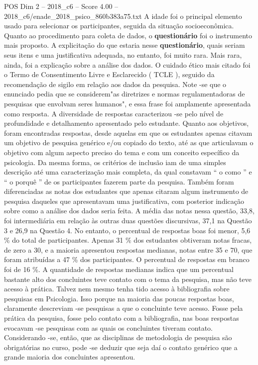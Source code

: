 \begin{textsample}{POS Dim 2 – 2018\_c6 – Score 4.00 – 2018\_c6/enade\_2018\_psico\_860b383a75.txt}
A idade foi o principal elemento usado para selecionar os participantes, seguida da situação socioeconômica.
Quanto ao procedimento para coleta de dados, o \textbf{questionário} foi o instrumento mais proposto.
A explicitação do que estaria nesse \textbf{questionário}, quais seriam seus itens e uma justificativa adequada, no entanto, foi muito rara.
Mais rara, ainda, foi a explicação sobre a análise dos dados.
O cuidado ético mais citado foi o Termo de Consentimento Livre e Esclarecido ( TCLE ), seguido da recomendação de sigilo em relação aos dados da pesquisa.
Note -se que o enunciado pedia que se considerem"as diretrizes e normas regulamentadoras de pesquisas que envolvam seres humanos", e essa frase foi amplamente apresentada como resposta.
A diversidade de respostas caracterizou -se pelo nível de profundidade e detalhamento apresentado pelo estudante.
Quanto aos objetivos, foram encontradas respostas, desde aquelas em que os estudantes apenas citavam um objetivo de pesquisa genérico e/ou copiado do texto, até as que articulavam o objetivo com algum aspecto preciso do tema e com um conceito específico da psicologia.
Da mesma forma, os critérios de inclusão iam de uma simples descrição até uma caracterização mais completa, da qual constavam “ o como ” e “ o porquê ” de os participantes fazerem parte da pesquisa.
Também foram diferenciadas as notas dos estudantes que apenas citaram algum instrumento de pesquisa daqueles que apresentavam uma justificativa, com posterior indicação sobre como a análise dos dados seria feita.
A média das notas nessa questão, 33,8, foi intermediária em relação às outras duas questões discursivas, 37,1 na Questão 3 e 26,9 na Questão 4.
No entanto, o percentual de respostas boas foi menor, 5,6 \% do total de participantes.
Apenas 31 \% dos estudantes obtiveram notas fracas, de zero a 30, e a maioria apresentou respostas medianas, notas entre 35 e 70, que foram atribuídas a 47 \% dos participantes.
O percentual de respostas em branco foi de 16 \%.
A quantidade de respostas medianas indica que um percentual bastante alto dos concluintes teve contato com o tema da pesquisa, mas não teve acesso à prática.
Talvez nem mesmo tenha tido acesso à bibliografia sobre pesquisas em Psicologia.
Isso porque na maioria das poucas respostas boas, claramente descreviam -se pesquisas a que o concluinte teve acesso.
Fosse pela prática da pesquisa, fosse pelo contato com a bibliografia, nas boas respostas evocavam -se pesquisas com as quais os concluintes tiveram contato.
Considerando -se, então, que as disciplinas de metodologia de pesquisa são obrigatórias no curso, pode -se deduzir que seja daí o contato genérico que a grande maioria dos concluintes apresentou.

\end{textsample}
